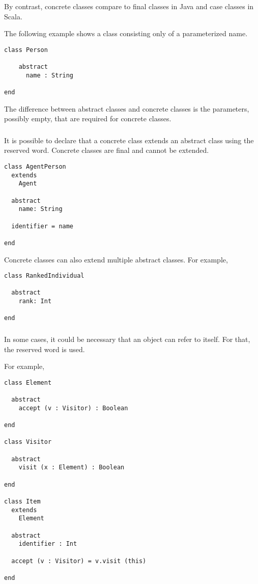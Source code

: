 By contrast, concrete classes compare to final classes in Java and case classes in Scala.

The following example shows a class consisting only of a parameterized name.
\begin{lstlisting}[label={lst:exampleConcreteClass}]
class Person

    abstract
      name : String

end
\end{lstlisting}

The difference between abstract classes and concrete classes is the parameters, possibly empty, that are required for concrete classes.

\subsubsection{\sodaextends}

It is possible to declare that a concrete class extends an abstract class using the \sodaextends reserved word.
Concrete classes are final and cannot be extended.

\begin{lstlisting}[label={lst:exampleExtends}]
class AgentPerson
  extends
    Agent

  abstract
    name: String

  identifier = name

end
\end{lstlisting}

Concrete classes can also extend multiple abstract classes.
For example,
\begin{lstlisting}[label={lst:exampleWith}]
class RankedIndividual

  abstract
    rank: Int

end
\end{lstlisting}

\subsubsection{\sodathis}

In some cases, it could be necessary that an object can refer to itself.
For that, the \sodathis reserved word is used.

For example,
\begin{lstlisting}[label={lst:exampleExtendsElement}]
class Element

  abstract
    accept (v : Visitor) : Boolean

end

class Visitor

  abstract
    visit (x : Element) : Boolean

end

class Item
  extends
    Element

  abstract
    identifier : Int

  accept (v : Visitor) = v.visit (this)

end
\end{lstlisting}

